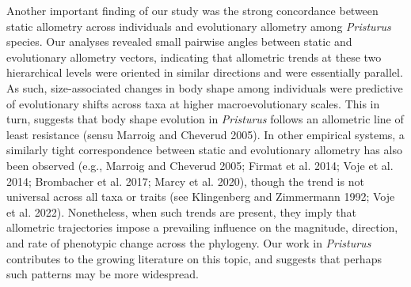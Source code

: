 \documentclass[
  11pt,
]{article}
\begin{document}
Another important finding of our study was the strong concordance
between static allometry across individuals and evolutionary allometry
among \emph{Pristurus} species. Our analyses revealed small pairwise
angles between static and evolutionary allometry vectors, indicating
that allometric trends at these two hierarchical levels were oriented in
similar directions and were essentially parallel. As such,
size-associated changes in body shape among individuals were predictive
of evolutionary shifts across taxa at higher macroevolutionary scales.
This in turn, suggests that body shape evolution in \emph{Pristurus}
follows an allometric line of least resistance (sensu Marroig and
Cheverud 2005). In other empirical systems, a similarly tight
correspondence between static and evolutionary allometry has also been
observed (e.g., Marroig and Cheverud 2005; Firmat et al. 2014; Voje et
al. 2014; Brombacher et al. 2017; Marcy et al. 2020), though the trend
is not universal across all taxa or traits (see Klingenberg and
Zimmermann 1992; Voje et al. 2022). Nonetheless, when such trends are
present, they imply that allometric trajectories impose a prevailing
influence on the magnitude, direction, and rate of phenotypic change
across the phylogeny. Our work in \emph{Pristurus} contributes to the
growing literature on this topic, and suggests that perhaps such
patterns may be more widespread.\hfill\break
\end{document}

